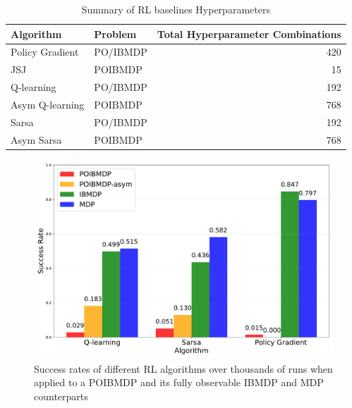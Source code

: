 \begin{table}[h]
    \centering
    \caption{Summary of RL baselines Hyperparameters}
    \begin{tabular}{llr}
    \toprule
    \textbf{Algorithm} & \textbf{Problem} & \textbf{Total Hyperparameter Combinations} \\
    \midrule
    Policy Gradient & PO/IBMDP & 420 \\
    JSJ & POIBMDP & 15 \\
    Q-learning & PO/IBMDP & 192 \\
    Asym Q-learning & POIBMDP & 768 \\
    Sarsa & PO/IBMDP & 192 \\
    Asym Sarsa & POIBMDP & 768 \\
    \bottomrule
    \end{tabular}
    \end{table}


\begin{figure}
    \centering
    \includegraphics[width=1\textwidth]{images/images_part1/algorithm_performance_comparison_flattened.pdf}
    \caption{Success rates of different RL algorithms over thousands of runs when applied to a POIBMDP and its fully observable IBMDP and MDP counterparts}\label{fig:po-vs-ib}
\end{figure}



